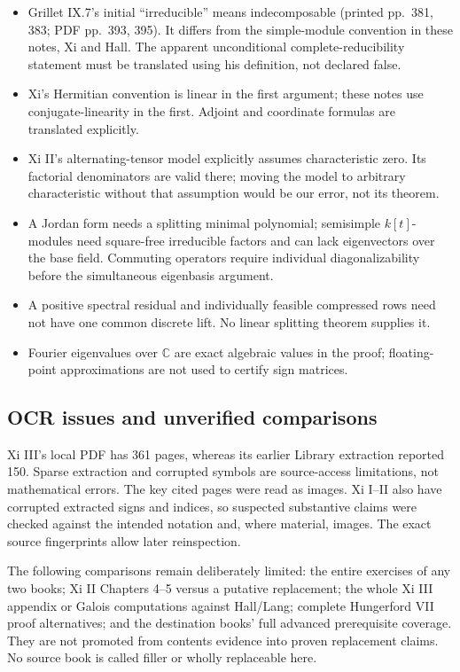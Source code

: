 \documentclass[
  11pt,
]{article}
\providecommand{\tightlist}{%
  \setlength{\itemsep}{0pt}\setlength{\parskip}{0pt}}
\begin{document}
\begin{itemize}
\tightlist
\item
  Grillet IX.7's initial ``irreducible'' means indecomposable (printed
  pp.~381, 383; PDF pp.~393, 395). It differs from the simple-module
  convention in these notes, Xi and Hall. The apparent unconditional
  complete-reducibility statement must be translated using his
  definition, not declared false.
\item
  Xi's Hermitian convention is linear in the first argument; these notes
  use conjugate-linearity in the first. Adjoint and coordinate formulas
  are translated explicitly.
\item
  Xi II's alternating-tensor model explicitly assumes characteristic
  zero. Its factorial denominators are valid there; moving the model to
  arbitrary characteristic without that assumption would be our error,
  not its theorem.
\item
  A Jordan form needs a splitting minimal polynomial; semisimple
  \(k[t]\)-modules need square-free irreducible factors and can lack
  eigenvectors over the base field. Commuting operators require
  individual diagonalizability before the simultaneous eigenbasis
  argument.
\item
  A positive spectral residual and individually feasible compressed rows
  need not have one common discrete lift. No linear splitting theorem
  supplies it.
\item
  Fourier eigenvalues over \(\mathbb C\) are exact algebraic values in
  the proof; floating-point approximations are not used to certify sign
  matrices.
\end{itemize}

\subsection{OCR issues and unverified
comparisons}\label{ocr-issues-and-unverified-comparisons}

Xi III's local PDF has 361 pages, whereas its earlier Library extraction
reported 150. Sparse extraction and corrupted symbols are source-access
limitations, not mathematical errors. The key cited pages were read as
images. Xi I--II also have corrupted extracted signs and indices, so
suspected substantive claims were checked against the intended notation
and, where material, images. The exact source fingerprints allow later
reinspection.

The following comparisons remain deliberately limited: the entire
exercises of any two books; Xi II Chapters 4--5 versus a putative
replacement; the whole Xi III appendix or Galois computations against
Hall/Lang; complete Hungerford VII proof alternatives; and the
destination books' full advanced prerequisite coverage. They are not
promoted from contents evidence into proven replacement claims. No
source book is called filler or wholly replaceable here.
\end{document}
